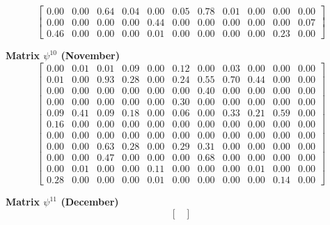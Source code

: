 \documentclass[a4paper,fleqn]{cas-dc}
\begin{document}
\begin{scriptsize}
\[\begin{bmatrix}
0.00 & 0.00 & 0.64 & 0.04 & 0.00 & 0.05 & 0.78 & 0.01 & 0.00 & 0.00 & 0.00\\

0.00 & 0.00 & 0.00 & 0.00 & 0.44 & 0.00 & 0.00 & 0.00 & 0.00 & 0.00 & 0.07\\

0.46 & 0.00 & 0.00 & 0.00 & 0.01 & 0.00 & 0.00 & 0.00 & 0.00 & 0.23 & 0.00

\end{bmatrix}
\]

\textbf{Matrix $\psi^{10}$ (November)}
\[
\begin{bmatrix}

0.00 & 0.01 & 0.01 & 0.09 & 0.00 & 0.12 & 0.00 & 0.03 & 0.00 & 0.00 & 0.00\\

0.01 & 0.00 & 0.93 & 0.28 & 0.00 & 0.24 & 0.55 & 0.70 & 0.44 & 0.00 & 0.00\\

0.00 & 0.00 & 0.00 & 0.00 & 0.00 & 0.00 & 0.40 & 0.00 & 0.00 & 0.00 & 0.00\\

0.00 & 0.00 & 0.00 & 0.00 & 0.00 & 0.30 & 0.00 & 0.00 & 0.00 & 0.00 & 0.00\\

0.09 & 0.41 & 0.09 & 0.18 & 0.00 & 0.06 & 0.00 & 0.33 & 0.21 & 0.59 & 0.00\\

0.16 & 0.00 & 0.00 & 0.00 & 0.00 & 0.00 & 0.00 & 0.00 & 0.00 & 0.00 & 0.00\\

0.00 & 0.00 & 0.00 & 0.00 & 0.00 & 0.00 & 0.00 & 0.00 & 0.00 & 0.00 & 0.00\\

0.00 & 0.00 & 0.63 & 0.28 & 0.00 & 0.29 & 0.31 & 0.00 & 0.00 & 0.00 & 0.00\\

0.00 & 0.00 & 0.47 & 0.00 & 0.00 & 0.00 & 0.68 & 0.00 & 0.00 & 0.00 & 0.00\\

0.00 & 0.01 & 0.00 & 0.00 & 0.11 & 0.00 & 0.00 & 0.00 & 0.01 & 0.00 & 0.00\\

0.28 & 0.00 & 0.00 & 0.00 & 0.01 & 0.00 & 0.00 & 0.00 & 0.00 & 0.14 & 0.00

\end{bmatrix}
\]

\textbf{Matrix $\psi^{11}$ (December)}
\[
\begin{bmatrix}


\end{bmatrix}\]
\end{scriptsize}
\end{document}
